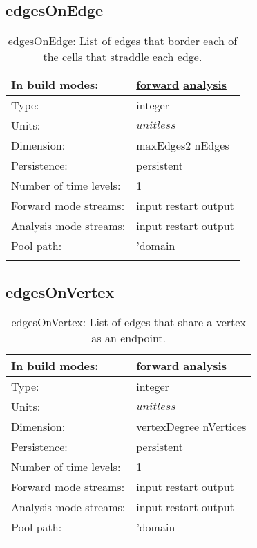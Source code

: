 \subsection[edgesOnEdge]{edgesOnEdge}
\label{subsec:var_sec_mesh_edgesOnEdge}
\begin{center}
\begin{longtable}{| p{2.0in} | p{4.0in} |}
        \hline 
        In build modes: & \hyperref[subsec:forward_var_tab_mesh]{forward} \hyperref[subsec:analysis_var_tab_mesh]{analysis} \\
        \hline 
        Type: & integer \\
        \hline 
        Units: & $unitless$ \\
        \hline 
        Dimension: & maxEdges2 nEdges \\
        \hline 
        Persistence: & persistent \\
        \hline 
        Number of time levels: & 1 \\
        \hline 
		 Forward mode streams: &  input restart output \\
        \hline 
		 Analysis mode streams: &  input restart output \\
        \hline 
            Pool path: & 'domain %
 \\
		 \hline 
    \caption{edgesOnEdge: List of edges that border each of the cells that straddle each edge.}
\end{longtable}
\end{center}
\subsection[edgesOnVertex]{edgesOnVertex}
\label{subsec:var_sec_mesh_edgesOnVertex}
\begin{center}
\begin{longtable}{| p{2.0in} | p{4.0in} |}
        \hline 
        In build modes: & \hyperref[subsec:forward_var_tab_mesh]{forward} \hyperref[subsec:analysis_var_tab_mesh]{analysis} \\
        \hline 
        Type: & integer \\
        \hline 
        Units: & $unitless$ \\
        \hline 
        Dimension: & vertexDegree nVertices \\
        \hline 
        Persistence: & persistent \\
        \hline 
        Number of time levels: & 1 \\
        \hline 
		 Forward mode streams: &  input restart output \\
        \hline 
		 Analysis mode streams: &  input restart output \\
        \hline 
            Pool path: & 'domain %
 \\
		 \hline 
    \caption{edgesOnVertex: List of edges that share a vertex as an endpoint.}
\end{longtable}
\end{center}
